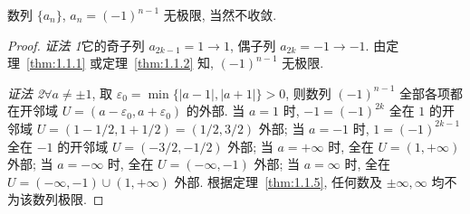 \begin{example}\label{ex:1.1.12}
数列 $\{a_{n}\}$, $a_{n} = (-1)^{n-1}$ 无极限, 当然不收敛.
\end{example}
\begin{proof}
\textit{证法 1}\quad 它的奇子列 $a_{2k-1} = 1 \to 1$, 偶子列 $a_{2k} = -1 \to -1$. 由定理~\ref{thm:1.1.1} 或定理~\ref{thm:1.1.2} 知, $(-1)^{n-1}$ 无极限.

\textit{证法 2}\quad $\forall a\neq\pm 1$, 取 $\varepsilon_{0}=\min\{|a-1|, |a+1|\}>0$, 则数列 $(-1)^{n-1}$ 全部各项都在开邻域 $U=(a-\varepsilon_0, a+\varepsilon_0)$ 的外部.
当 $a=1$ 时, $-1=(-1)^{2k}$ 全在 $1$ 的开邻域 $U=(1-1/2, 1+1/2)=(1/2, 3/2)$ 外部;
当 $a=-1$ 时, $1=(-1)^{2k-1}$ 全在 $-1$ 的开邻域 $U=(-3/2, -1/2)$ 外部;
当 $a=+\infty$ 时, 全在 $U=(1, +\infty)$ 外部;
当 $a=-\infty$ 时, 全在 $U=(-\infty, -1)$ 外部;
当 $a=\infty$ 时, 全在 $U=(-\infty, -1)\cup(1, +\infty)$ 外部.
根据定理~\ref{thm:1.1.5}, 任何数及 $\pm\infty, \infty$ 均不为该数列极限.
\end{proof}

